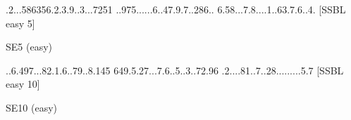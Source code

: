\documentclass[,landscape,letterpaper,10pt]{article}
\title{}
\author{Germán Avendaño Ramírez}
\begin{document}
\begin{multicols}{2}
\renewcommand*{\puzzlefile}{se5.sud}
\writepuzzle%
{.2...5863}{56.2.3.9.}{.3...7251}%
{..975....}{..6..47.9}{.7..286..}%
{6.58...7.}{8....1..6}{3.7.6..4.}%
[SSBL easy 5]
\vfill
\begin{minipage}{0.95\linewidth}\begin{center}
SE5 (easy) \\
\end{center}\end{minipage}

\renewcommand*{\puzzlefile}{se10.sud}
\writepuzzle%
{..6.497..}{.82.1.6..}{79..8.145}%
{649.5.27.}{..7.6..5.}{.3..72.96}%
{.2....81.}{.7..28...}{......5.7}%
[SSBL easy 10]
\vfill
\begin{minipage}{0.95\linewidth}\begin{center}
SE10 (easy) \\
\end{center}\end{minipage}

\end{multicols}
\end{document}
